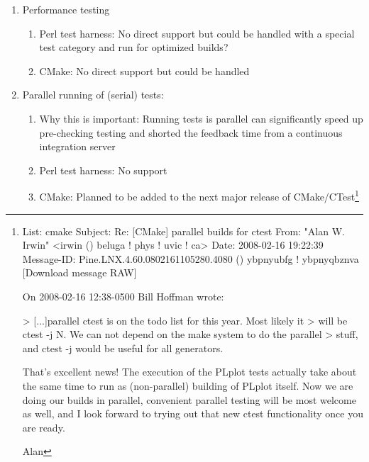 \documentclass[pdf,ps2pdf,11pt]{SANDreport}
\begin{document}
\begin{enumerate}
  \begin{enumerate}

  {}\item Performance testing

    \begin{enumerate}

    {}\item Perl test harness: No direct support but could be handled
    with a special test category and run for optimized builds?

    {}\item CMake: No direct support but could be handled

    \end{enumerate}

  {}\item Parallel running of (serial) tests:

    \begin{enumerate}

    {}\item Why this is important: Running tests is parallel can
    significantly speed up pre-checking testing and shorted the
    feedback time from a continuous integration server

    {}\item Perl test harness: No support

    {}\item CMake: Planned to be added to the next major release of
    CMake/CTest\footnote{

List:       cmake
Subject:    Re: [CMake] parallel builds for ctest
From:       "Alan W. Irwin" <irwin () beluga ! phys ! uvic ! ca>
Date:       2008-02-16 19:22:39
Message-ID: Pine.LNX.4.60.0802161105280.4080 () ybpnyubfg ! ybpnyqbznva
[Download message RAW]

On 2008-02-16 12:38-0500 Bill Hoffman wrote:

> [...]parallel ctest is on the todo list for this year.  Most likely  it 
> will be ctest -j N.   We can not depend on the make system to do the parallel 
> stuff, and ctest -j would be useful for all generators.

That's excellent news!  The execution of the PLplot tests actually take
about the same time to run as (non-parallel) building of PLplot itself. Now
we are doing our builds in parallel, convenient parallel testing will be
most welcome as well, and I look forward to trying out that new ctest
functionality once you are ready.

Alan
} %


\end{enumerate}
\end{enumerate}
\end{enumerate}
\end{document}
